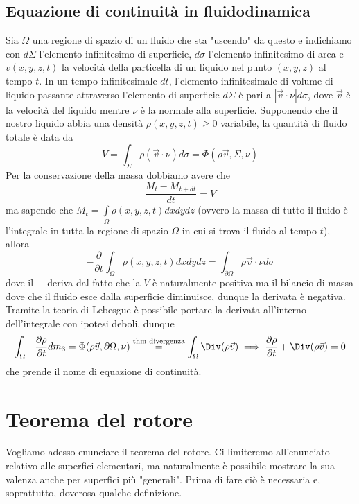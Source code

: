 \subsection{Equazione di continuità in fluidodinamica}
Sia $\Omega$ una regione di spazio di un fluido che sta "uscendo" da questo e indichiamo con $d\Sigma$ l'elemento infinitesimo di superficie, $d\sigma$ l'elemento infinitesimo di area e $v(x, y, z, t)$ la velocità della particella di un liquido nel punto $(x, y, z)$ al tempo $t$. In un tempo
infinitesimale $dt$, l'elemento infinitesimale di volume di liquido passante attraverso l'elemento di superficie $d\Sigma$ è pari a $|\vec{v} \cdot \nu|d\sigma$, dove $\vec{v}$ è la velocità del liquido mentre $\nu$ è la normale alla
superficie. Supponendo che il nostro liquido abbia una densità $\rho(x, y, z, t) \geq 0$ variabile, la quantità di fluido totale è data da
$$
V = \int_\Sigma \rho (\vec{v} \cdot \nu)d\sigma = \Phi(\rho \vec{v}, \Sigma, \nu) 
$$
Per la conservazione della massa dobbiamo avere che
$$
\frac{M_t - M_{t+dt}}{dt} = V
$$
ma sapendo che $M_t = \int\limits_\Omega \rho(x, y, z, t) dxdydz$ (ovvero la massa di tutto il fluido è l'integrale in tutta la regione di spazio $\Omega$ in cui si trova il fluido al tempo $t$), allora
$$
-\frac{\partial}{\partial t} \int_\Omega \rho(x, y, z, t)dxdydz = \int_{\partial \Omega} \rho \vec{v} \cdot \nu d\sigma
$$
dove il $-$ deriva dal fatto che la $V$ è naturalmente positiva ma il bilancio di massa dove che il fluido esce dalla superficie diminuisce, dunque la derivata è negativa. Tramite la teoria di Lebesgue è possibile portare la derivata all'interno dell'integrale con ipotesi deboli, dunque
$$
\int_\Omega - \frac{\partial \rho}{\partial t} dm_3 = \Phi(\rho \vec{v}, \partial \Omega, \nu) \stackrel{\text{thm divergenza}}{=} \int_\Omega \Div(\rho \vec{v}) \implies \frac{\partial \rho}{\partial t} + \Div(\rho \vec{v}) = 0
$$
che prende il nome di equazione di continuità.
%
\vspace{0.5cm}
\section{Teorema del rotore}
Vogliamo adesso enunciare il teorema del rotore. Ci limiteremo all'enunciato relativo alle superfici elementari, ma naturalmente è possibile mostrare la sua valenza anche per superfici più "generali". Prima di fare ciò è necessaria e, soprattutto, doverosa qualche definizione.
%
\vspace{0.5cm}

